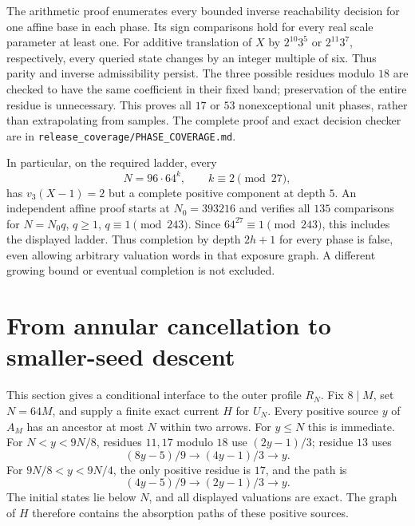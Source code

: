 \documentclass[11pt]{article}
\begin{document}
The arithmetic proof enumerates every bounded inverse reachability
decision for one affine base in each phase. Its sign comparisons hold
for every real scale parameter at least one. For additive translation
of $X$ by $2^{10}3^5$ or $2^{11}3^7$, respectively, every queried
state changes by an integer multiple of six. Thus parity and inverse
admissibility persist. The three possible residues modulo $18$ are
checked to have the same coefficient in their fixed band; preservation
of the entire residue is unnecessary. This proves all $17$ or $53$
nonexceptional unit phases, rather than extrapolating from samples.
The complete proof and exact decision checker are in
\texttt{release\_coverage/PHASE\_COVERAGE.md}.

In particular, on the required ladder, every
\[
N=96\cdot64^k,\qquad k\equiv2\pmod{27},
\]
has $v_3(X-1)=2$ but a complete positive component at depth $5$.
An independent affine proof starts at $N_0=393216$ and verifies all
$135$ comparisons for $N=N_0q$, $q\ge1$, $q\equiv1\pmod{243}$.
Since $64^{27}\equiv1\pmod{243}$, this includes the displayed ladder.
Thus completion by depth $2h+1$ for every phase is false, even allowing
arbitrary valuation words in that exposure graph. A different growing
bound or eventual completion is not excluded.

\section{From annular cancellation to smaller-seed descent}
This section gives a conditional interface to the outer profile $R_N$.
Fix $8\mid M$, set $N=64M$, and supply a finite exact current $H$ for
$U_N$. Every positive source $y$ of $A_M$ has an ancestor at most $N$
within two arrows. For $y\le N$ this is immediate. For
$N<y<9N/8$, residues $11,17$ modulo $18$ use $(2y-1)/3$; residue $13$
uses
\[
(8y-5)/9\longrightarrow(4y-1)/3\longrightarrow y.
\]
For $9N/8<y<9N/4$, the only positive residue is $17$, and the path is
\[
(4y-5)/9\longrightarrow(2y-1)/3\longrightarrow y.
\]
The initial states lie below $N$, and all displayed valuations are exact.
The graph of $H$ therefore contains the absorption paths of these positive
sources.
\end{document}

